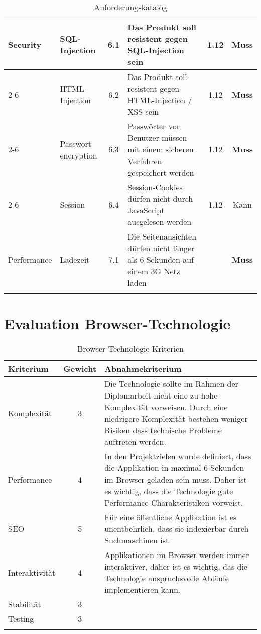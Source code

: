 \begin{longtable}[]{@{}p{1.9cm}p{2.5cm}cp{5.5cm}cc@{}}
  \midrule
  \multirow{9}{*}{Security}  & SQL-Injection              & 6.1          & Das Produkt soll resistent gegen SQL-Injection sein                                                         & 1.12          & \textbf{Muss}                \\ \cline{2-6}
                             & HTML-Injection             & 6.2          & Das Produkt soll resistent gegen HTML-Injection / XSS sein                                                  & 1.12          & \textbf{Muss}                \\ \cline{2-6}
                             & Passwort encryption        & 6.3          & Passwörter von Benutzer müssen mit einem sicheren Verfahren gespeichert werden                              & 1.12          & \textbf{Muss}                \\ \cline{2-6}
                             & Session                    & 6.4          & Session-Cookies dürfen nicht durch JavaScript ausgelesen werden                                             & 1.12          & Kann                         \\
  \midrule
  Performance                & Ladezeit                   & 7.1          & Die Seitenansichten dürfen nicht länger als 6 Sekunden auf einem 3G Netz laden                              &               & \textbf{Muss}                \\
  \bottomrule
  \caption{Anforderungskatalog}
\end{longtable}


\clearpage
\section{Evaluation Browser-Technologie}\label{evaluation-browser-technologie}

\begin{longtable}[]{@{}p{2cm}cp{10cm}@{}}
  \toprule
  \textbf{Kriterium} & \textbf{Gewicht} & \textbf{Abnahmekriterium}\tabularnewline
  \midrule
  \endhead
  Komplexität        & 3                & Die Technologie sollte im Rahmen der Diplomarbeit nicht eine zu hohe Komplexität vorweisen. Durch eine niedrigere Komplexität bestehen weniger Risiken dass technische Probleme auftreten werden.\tabularnewline
  \midrule
  Performance        & 4                & In den Projektzielen wurde definiert, dass die Applikation in maximal 6 Sekunden im Browser geladen sein muss. Daher ist es wichtig, dass die Technologie gute Performance Charakteristiken vorweist.\tabularnewline
  \midrule
  SEO                & 5                & Für eine öffentliche Applikation ist es unentbehrlich, dass sie indexierbar durch Suchmaschinen ist.\tabularnewline
  \midrule
  Interaktivität     & 4                & Applikationen im Browser werden immer interaktiver, daher ist es wichtig, das die Technologie anspruchsvolle Abläufe implementieren kann. \tabularnewline
  \midrule
  Stabilität         & 3                & \tabularnewline
  \midrule
  Testing            & 3                & \tabularnewline
  \bottomrule
  \caption{Browser-Technologie Kriterien}
\end{longtable}


